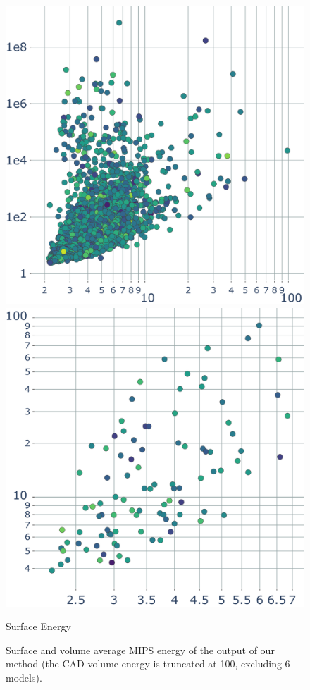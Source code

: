 \begin{figure}
    \parbox{.3\linewidth}{\includegraphics[width=\linewidth]{curve_meshing_in_shell_tex/figs/stats/energy_ABC}}\hfill
    \parbox{.3\linewidth}{\includegraphics[width=\linewidth]{curve_meshing_in_shell_tex/figs/stats/energy_PoLyCube}}\par
    \scriptsize{Surface Energy}
    \caption{Surface and volume average MIPS energy of the output of our method (the CAD volume energy is truncated at 100, excluding 6 models).}
    \label{bichon:fig:quality}
\end{figure}

